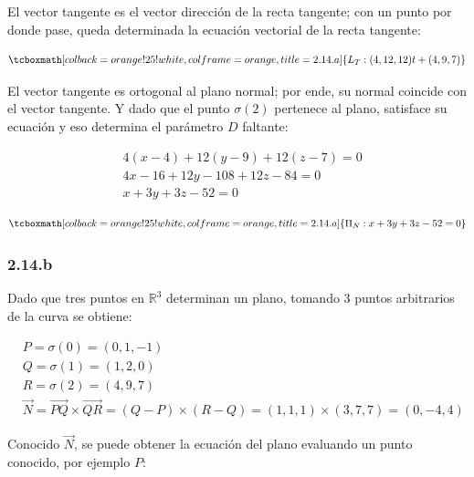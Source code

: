 \documentclass{article}
\renewcommand{\Bbb}{\mathbb}
\begin{document}
El vector tangente es el vector dirección de la recta tangente; con un punto por donde pase, queda determinada la ecuación vectorial de la recta tangente:

\begin{equation}
\tcboxmath[colback=orange!25!white,colframe=orange,title=2.14.a]
{
L_T : (4, 12, 12) t + (4, 9, 7)
}
\end{equation}

El vector tangente es ortogonal al plano normal; por ende, su normal coincide con el vector tangente. Y dado que el punto $\sigma(2)$ pertenece al plano, satisface su ecuación y eso determina el parámetro $D$ faltante:

\begin{subequations}
\begin{align}
& 4 (x - 4) + 12 (y - 9) + 12 (z - 7) = 0 \\
& 4x - 16 + 12y - 108 + 12z - 84 = 0 \\
& x + 3y +3z - 52 = 0
\end{align}
\end{subequations}

\begin{equation}
\tcboxmath[colback=orange!25!white,colframe=orange,title=2.14.a]
{
\Pi_N : x + 3y + 3z - 52 = 0
}
\end{equation}

\subsubsection*{2.14.b}
\label{subsubsec:2.14.b}

Dado que tres puntos en $\Bbb R^3$ determinan un plano, tomando 3 puntos arbitrarios de la curva se obtiene:

\begin{subequations}
\begin{align}
& P = \sigma(0) = (0, 1, -1) \\
& Q = \sigma(1) = (1, 2, 0) \\
& R = \sigma(2) = (4, 9, 7) \\
& \overrightarrow{N} = \overrightarrow{PQ} \times \overrightarrow{QR} = (Q-P) \times (R-Q) = (1, 1, 1) \times (3, 7, 7) = (0, -4, 4)
\end{align}
\end{subequations}

Conocido $\overrightarrow{N}$, se puede obtener la ecuación del plano evaluando un punto conocido, por ejemplo $P$:
\end{document}
